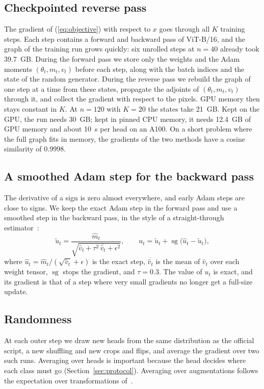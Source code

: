 \documentclass[journal]{IEEEtran}
\newcommand{\sg}{\operatorname{sg}}
\begin{document}
\subsection{Checkpointed reverse pass}
The gradient of (\ref{eq:objective}) with respect to $x$ goes through all $K$ training steps. Each step contains a
forward and backward pass of ViT-B/16, and the graph of the training run grows quickly: six unrolled steps at $n=40$
already took 39.7~GB. During the forward pass we store only the weights and the Adam moments $(\theta_t, m_t, v_t)$ before each step,
along with the batch indices and the state of the random generator. During the reverse pass we rebuild the graph of
one step at a time from these states, propagate the adjoints of $(\theta_t, m_t, v_t)$ through it, and collect the
gradient with respect to the pixels. GPU memory then stays constant in $K$. At $n=120$ with $K=20$ the states take
21~GB. Kept on the GPU, the run needs 30~GB; kept in pinned CPU memory, it needs 12.4~GB of GPU memory and about
10~s per head on an A100.
On a short problem where the full graph fits in memory, the gradients of the two methods have a cosine similarity of
0.9998.

\subsection{A smoothed Adam step for the backward pass}
The derivative of a sign is zero almost everywhere, and early Adam steps are close to signs. We keep the exact Adam
step in the forward pass and use a smoothed step in the backward pass, in the style of a straight-through
estimator~\cite{bengio2013ste}:
\begin{equation}
\tilde u_t = \frac{\hat m_t}{\sqrt{\hat v_t + \tau^2\,\overline{\hat v_t} + \epsilon^2}},\qquad
u_t = \tilde u_t + \sg\!\big(\hat u_t - \tilde u_t\big),
\label{eq:ste}
\end{equation}
where $\hat u_t = \hat m_t/(\sqrt{\hat v_t}+\epsilon)$ is the exact step, $\overline{\hat v_t}$ is the mean of
$\hat v_t$ over each weight tensor, $\sg$ stops the gradient, and $\tau=0.3$. The value of $u_t$ is exact, and its
gradient is that of a step where very small gradients no longer get a full-size update.

\subsection{Randomness}
At each outer step we draw new heads from the same distribution as the official script, a new shuffling and new
crops and flips, and average the gradient over two such runs. Averaging over heads is important because the head
decides where each class must go (Section~\ref{sec:protocol}). Averaging over augmentations follows the expectation
over transformations of~\cite{athalye2018eot}.
\end{document}
